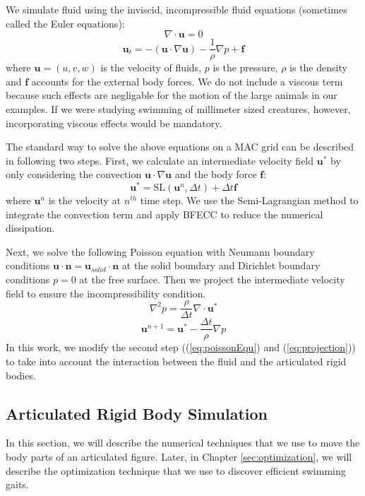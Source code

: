 We simulate fluid using the inviscid, incompressible fluid equations
(sometimes called the Euler equations):
\begin{displaymath}
 \nabla\cdot\mathbf{u}=0
\end{displaymath}
\begin{displaymath}
 \mathbf{u}_t=-(\mathbf{u}\cdot\nabla\mathbf{u})-\frac{1}{\rho}\nabla
 p+\mathbf{f}
\end{displaymath}
where $\mathbf{u}=(u,v,w)$ is the velocity of fluids, $p$ is the pressure,
$\rho$ is the density and $\mathbf{f}$ accounts for the external body
forces.  We do not include a viscous term because such effects are
negligable for the motion of the large animals in our examples.  If we
were studying swimming of millimeter sized creatures, however,
incorporating viscous effects would be mandatory.

The standard way to solve the above equations on a MAC grid can be described in following two steps. First, we calculate an intermediate velocity field $\mathbf{u}^*$ by only considering the convection $\mathbf{u}\cdot\nabla\mathbf{u}$ and the body force $\mathbf{f}$:
\begin{equation}
 \mathbf{u}^*=\textrm{SL}(\mathbf{u}^n,\Delta t)+\Delta t\mathbf{f}
\label{eq:sl}
\end{equation}
where $\mathbf{u}^n$ is the velocity at $n^{th}$ time step.
We use the Semi-Lagrangian method \cite{stam99stablefluids} to integrate the convection term and apply BFECC \cite{kim06advectionswith} to reduce the numerical dissipation.

Next, we solve the following Poisson equation with Neumann boundary conditions $\mathbf{u}\cdot\mathbf{n}=\mathbf{u}_{solid}\cdot\mathbf{n}$ at the solid boundary and Dirichlet
boundary conditions $p = 0$ at the free surface. Then we project the intermediate velocity field to ensure the incompressibility condition.
\begin{equation}
\label{eq:poissonEqu}
 \nabla^2 p=\frac{\rho}{\Delta t}\nabla\cdot\mathbf{u}^*
\end{equation}
\begin{equation}
\label{eq:projection}
 \mathbf{u}^{n+1}=\mathbf{u}^*-\frac{\Delta t}{\rho}\nabla p
\end{equation}
In this work, we modify the second step ((\ref{eq:poissonEqu}) and (\ref{eq:projection})) to take into account the interaction between the fluid and the articulated rigid bodies.

\subsection{Articulated Rigid Body Simulation}
\label{sec:articulatedSim}
In this section, we will describe the numerical techniques that we use to move the body parts of an articulated figure. Later, in Chapter \ref{sec:optimization}, we will describe the optimization technique that we use to discover efficient swimming gaits.

